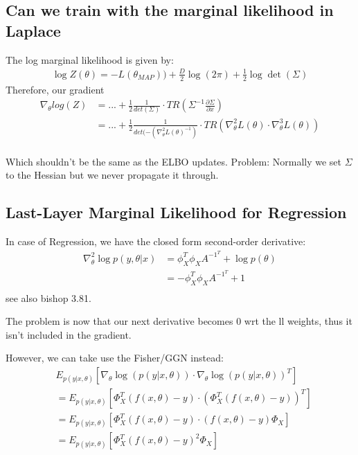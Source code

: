 \documentclass[a4paper]{scrartcl}
\begin{document}
\subsection{Can we train with the marginal likelihood in Laplace}
The log marginal likelihood is given by:
\begin{align*}
    \log Z(\theta) =-L(\theta_{MAP}))+ \frac{D}{2}\log(2\pi) + \frac{1}{2}\log\det(\Sigma)
\end{align*}
Therefore, our gradient 
\begin{align}
    \nabla_\theta log(Z) 
    &= ... + \frac{1}{2} \frac{1}{det(\Sigma)}\cdot TR(\Sigma^{-1} \frac{\partial \Sigma}{\partial x})\\
    &= ... + \frac{1}{2} \frac{1}{det(-(\nabla^2_\theta L(\theta)^{-1})}\cdot TR(\nabla^2_\theta L(\theta) \cdot  \nabla^3_\theta L(\theta))\\
\end{align}

Which shouldn't be the same as the ELBO updates. Problem: Normally
we set $\Sigma$ to the Hessian but we never propagate it through. 

\subsection{Last-Layer Marginal Likelihood for Regression}
  In case of Regression, we have the closed form second-order derivative:
  \begin{align}
    \nabla^2_\theta \log p(y, \theta \vert x) &= \phi_X^T \phi_X A^{-1^T} + \log p(\theta)\\
    &= - \phi_X^T \phi_X A^{-1^T} + 1\\
  \end{align}
  see also bishop 3.81.

  The problem is now that our next derivative becomes 0 wrt the ll weights, thus
  it isn't included in the gradient.

  However, we can take use the Fisher/GGN instead:
  \begin{align}
    &E_{p(y \vert x, \theta)}[\nabla_\theta \log(p(y \vert x, \theta)) \cdot \nabla_\theta \log(p(y \vert x, \theta))^T]\\
    &= E_{p(y \vert x, \theta)}[\Phi_X^T (f(x, \theta) - y) \cdot (\Phi_X^T (f(x, \theta) - y))^T]\\
    &= E_{p(y \vert x, \theta)}[\Phi_X^T (f(x, \theta) - y) \cdot (f(x, \theta) - y) \Phi_X ]\\
    &= E_{p(y \vert x, \theta)}[\Phi_X^T (f(x, \theta) - y)^2 \Phi_X ]\\
  \end{align}
\end{document}
